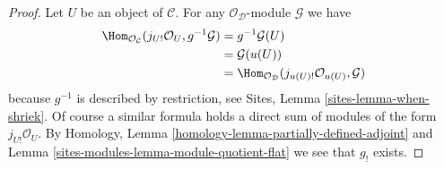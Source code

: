 \begin{proof}
Let $U$ be an object of $\mathcal{C}$. For any
$\mathcal{O}_\mathcal{D}$-module $\mathcal{G}$ we have
\begin{align*}
\Hom_{\mathcal{O}_\mathcal{C}}(j_{U!}\mathcal{O}_U, g^{-1}\mathcal{G})
& =
g^{-1}\mathcal{G}(U) \\
& =
\mathcal{G}(u(U)) \\
& =
\Hom_{\mathcal{O}_\mathcal{D}}(j_{u(U)!}\mathcal{O}_{u(U)}, \mathcal{G})
\end{align*}
because $g^{-1}$ is described by restriction, see
Sites, Lemma \ref{sites-lemma-when-shriek}.
Of course a similar formula holds a direct sum of modules
of the form $j_{U!}\mathcal{O}_U$. By
Homology, Lemma \ref{homology-lemma-partially-defined-adjoint}
and
Lemma \ref{sites-modules-lemma-module-quotient-flat}
we see that $g_!$ exists.
\end{proof}

